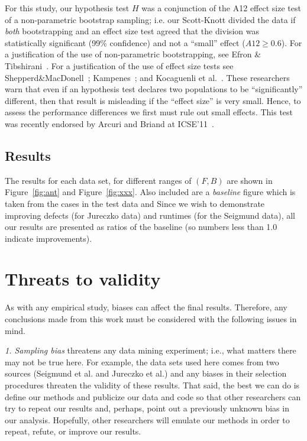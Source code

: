 \documentclass[conference]{IEEEtran}
\newcommand{\fig}[1]{Figure~\ref{fig:#1}}
\begin{document}
For this study, our hypothesis test $H$ was a
conjunction of the A12 effect size test of  a
non-parametric bootstrap sampling; i.e. our
Scott-Knott divided the data if {\em both}
bootstrapping and an effect size test agreed that
the division was statistically significant (99\%
confidence) and not a ``small'' effect ($A12 \ge
0.6$).
For a justification of the use of non-parametric
bootstrapping, see Efron \&
Tibshirani~\cite[p220-223]{efron93}.
For a justification of the use of effect size tests
see Shepperd\&MacDonell~\cite{shepperd12a}; Kampenes~\cite{kampenes07}; and
Kocaguenli et al.~\cite{kocharm13}. These researchers
warn that even if an
hypothesis test declares two populations to be
``significantly'' different, then that result is
misleading if the ``effect size'' is very small.
Hence, to assess 
the performance differences 
we first must rule out small effects.
This test was recently 
endorsed by Arcuri and Briand
at ICSE'11~\cite{arcuri11}.
 
  
\subsection{Results}
The results for each data set, for different ranges of $(F,B)$ are shown in \fig{ant} and \fig{xxx}.
Also included are a {\em baseline} figure which is taken from the cases in the test data
and  Since we wish to demonstrate
improving defects
(for Jureczko data) and runtimes (for the Seigmund data), all our results are presented as ratios of the baseline (so numbers less than 1.0 indicate improvements).

  
 

\section{Threats to validity}

 

As with any empirical study, biases can affect the final results. Therefore, any
conclusions made from this work must be considered with the following issues in
mind.

{\em 1. Sampling bias} threatens any data mining experiment; i.e., what matters
there may not be true here. For example, the data sets used here comes from two sources
(Seigmund et al. and Jureczko et al.) and any biases in their selection procedures
threaten the validity of these results. 
That said,
the best we can do is define our methods and publicize our data and code so that other researchers can
try to repeat our results and, perhaps, point out a previously unknown bias
in our analysis. Hopefully, other researchers will emulate our methods in
order to repeat, refute, or improve our results. 
\end{document}
